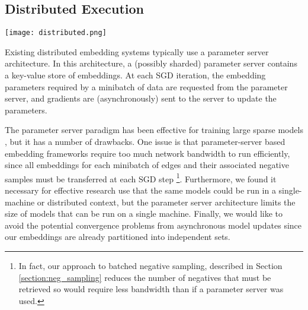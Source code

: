 \documentclass{article}
\begin{document}
\subsection{Distributed Execution}

\begin{figure*}[t]
\centering
\texttt{[image: distributed.png]}
\caption{A block diagram of the modules used for PBG's distributed mode. Arrows illustrate the communications that the Rank 2 Trainer performs for the training of one bucket. First, the trainer requests a bucket from the lock server on Rank 1, which locks that bucket's partitions. The trainer then saves any partitions that it is no longer using and loads new partitions that it needs to and from the sharded partition servers, at which point it can release its old partitions on the lock server. Edges are then loaded from a shared filesystem, and training occurs on multiple threads without inter-thread synchronization\cite{hogwild}. In a separate thread, a small number of shared parameters are continuously synchronized with a sharded parameter server. Model checkpoints are occasionally written to the shared filesystem from the trainers.}
\label{fig:distributed}
\end{figure*}

Existing distributed embedding systems typically use a parameter server architecture. In this architecture, a (possibly sharded) parameter server contains a key-value store of embeddings. At each SGD iteration, the embedding parameters required by a minibatch of data are requested from the parameter server, and gradients are (asynchronously) sent to the server to update the parameters. 

The parameter server paradigm has been effective for training large sparse models \cite{Li2014}, but it has a number of drawbacks. One issue is that parameter-server based embedding frameworks require too much network bandwidth to run efficiently, since all embeddings for each minibatch of edges and their associated negative samples must be transferred at each SGD step \cite{gridword2vec} \footnote{In fact, our approach to batched negative sampling, described in Section \ref{section:neg_sampling} reduces the number of negatives that must be retrieved so would require less bandwidth than \cite{gridword2vec} if a parameter server was used.}. Furthermore, we found it necessary for effective research use that the same models could be run in a single-machine or distributed context, but the parameter server architecture limits the size of models that can be run on a single machine. Finally, we would like to avoid the potential convergence problems from asynchronous model updates since our embeddings are already partitioned into independent sets.
\end{document}
